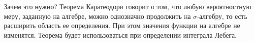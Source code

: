 \documentclass[../TV&MS.tex]{subfiles}
\begin{document}
\begin{Why}
	Зачем это нужно? Теорема Каратеодори говорит о том, что любую вероятностную меру, 
	заданную на алгебре, можно однозначно продолжить на $\sigma$-алгебру, то есть расширить 
	область ее определения. При этом значения функции на алгебре не изменятся. Теорема будет 
	использоваться при определении интеграла Лебега.
\end{Why}
\newpage
\end{document}
